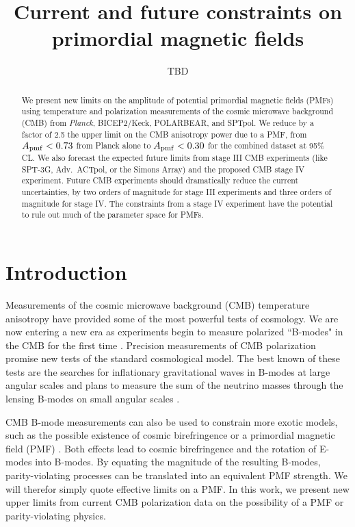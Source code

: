 \documentclass[preprint]{emulateapj}
\newcommand{\apmf}{\ensuremath{A_{\rm pmf}}}
\newcommand{\planck}{{\sl Planck}}
\newcommand{\bicepkeck}{BICEP2/Keck}
\newcommand{\sptnew}{SPT-3G}
\newcommand{\pb}{POLARBEAR}
\newcommand{\simons}{Simons Array}
\newcommand{\sptpol}{SPTpol}
\newcommand{\advactpol}{Adv.~ACTpol}
\newcommand{\tbd}[1]{\textcolor{Red}{{\bf TBD}: #1}}
\begin{document}
\title{Current and future constraints on primordial magnetic fields}
\author{TBD}


\begin{abstract}

We present new limits on the amplitude of potential primordial magnetic fields (PMFs) using temperature and polarization measurements of the cosmic microwave background (CMB)  from \planck{}, \bicepkeck{}, \pb, and \sptpol. 
We reduce by a factor of 2.5 the upper limit on the CMB anisotropy power due to a PMF, from $\apmf < 0.73$ from Planck alone to $\apmf < 0.30$ for the combined dataset at 95\% CL. 
We also forecast the expected future limits from stage III CMB experiments (like \sptnew{},  \advactpol, or the \simons) and the proposed CMB stage IV experiment. 
Future CMB experiments should dramatically reduce the current uncertainties, by two orders of magnitude for stage III experiments and three orders of magnitude for stage IV. 
The constraints from a stage IV experiment have the potential to rule out much of the parameter space for PMFs.

\end{abstract}

\section{Introduction}
\label{sec:intro}

Measurements of the cosmic microwave background (CMB) temperature anisotropy have provided some of the most powerful tests of cosmology. 
We are now entering a new era as experiments begin to measure  polarized ``B-modes" in the CMB for the first time \citep{XXXX}. 
Precision measurements of CMB polarization promise new tests of the standard cosmological model. 
The best known of these tests are the searches for inflationary gravitational waves in B-modes at large angular scales \citep{XXX} and plans to measure the sum of the neutrino masses through the lensing B-modes on small angular scales \citep{XXX}. 

CMB B-mode measurements can also be used to constrain more exotic models, such as the possible existence of cosmic birefringence \citep{carroll98,lue99} or a primordial magnetic field (PMF) \citep{kosowsky96, seshadri01}.  
Both effects lead to cosmic birefringence and the rotation of E-modes into B-modes. 
By equating the magnitude of the resulting B-modes, parity-violating processes can be translated into an equivalent PMF strength. 
We will therefor simply quote effective limits on a PMF. 
In this work, we present new upper limits from current CMB polarization data on the possibility of a PMF or parity-violating physics. 
\end{document}
